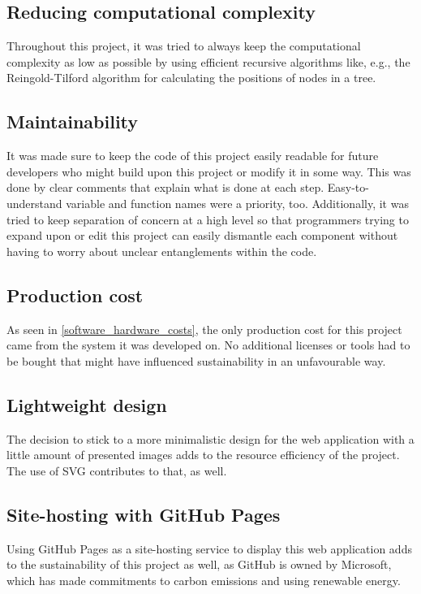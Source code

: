 \subsection{Reducing computational complexity}
Throughout this project, it was tried to always keep the computational complexity as low as possible by using efficient recursive algorithms like, e.g., the Reingold-Tilford algorithm for calculating the positions of nodes in a tree.

\subsection{Maintainability}
It was made sure to keep the code of this project easily readable for future developers who might build upon this project or modify it in some way. This was done by clear comments that explain what is done at each step. Easy-to-understand variable and function names were a priority, too. Additionally, it was tried to keep separation of concern at a high level so that programmers trying to expand upon or edit this project can easily dismantle each component without having to worry about unclear entanglements within the code.

\subsection{Production cost}
As seen in \ref{software_hardware_costs}, the only production cost for this project came from the system it was developed on. No additional licenses or tools had to be bought that might have influenced sustainability in an unfavourable way.

\subsection{Lightweight design}
The decision to stick to a more minimalistic design for the web application with a little amount of presented images adds to the resource efficiency of the project. The use of SVG contributes to that, as well.

\subsection{Site-hosting with GitHub Pages}
Using GitHub Pages as a site-hosting service to display this web application adds to the sustainability of this project as well, as GitHub is owned by Microsoft, which has made commitments to carbon emissions and using renewable energy.

